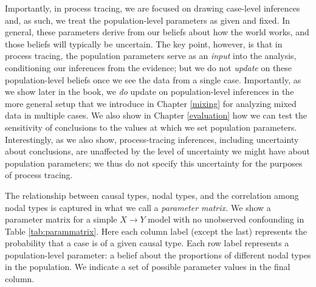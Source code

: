 \documentclass[
  12pt,
]{book}
\begin{document}
Importantly, in process tracing, we are focused on drawing case-level inferences and, as such, we treat the population-level parameters as given and fixed. In general, these parameters derive from our beliefs about how the world works, and those beliefs will typically be uncertain. The key point, however, is that in process tracing, the population parameters serve as an \emph{input} into the analysis, conditioning our inferences from the evidence; but we do not \emph{update} on these population-level beliefs once we see the data from a single case. Importantly, as we show later in the book, we \emph{do} update on population-level inferences in the more general setup that we introduce in Chapter \ref{mixing} for analyzing mixed data in multiple cases. We also show in Chapter \ref{evaluation} how we can test the sensitivity of conclusions to the values at which we set population parameters. Interestingly, as we also show, process-tracing inferences, including uncertainty about conclusions, are unaffected by the level of uncertainty we might have about population parameters; we thus do not specify this uncertainty for the purposes of process tracing.

The relationship between causal types, nodal types, and the correlation among nodal types is captured in what we call a \emph{parameter matrix.} We show a parameter matrix for a simple \(X \rightarrow Y\) model with no unobserved confounding in Table \ref{tab:parammatrix}. Here each column label (except the last) represents the probability that a case is of a given causal type. Each row label represents a population-level parameter: a belief about the proportions of different nodal types in the population. We indicate a set of possible parameter values in the final column.
\end{document}
